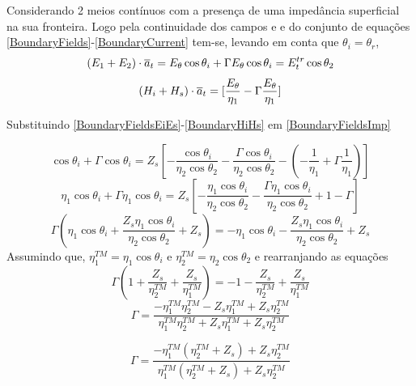 \documentclass[
	12pt,				%
	openright,			%
	oneside,			%
	a4paper,			%
	english,			%
	brazil				%
	]{abntex2}
\begin{document}
\begin{apendicesenv}
Considerando 2 meios contínuos com a presença de uma impedância superficial na sua fronteira. Logo pela continuidade dos campos e e do conjunto de equações \ref{BoundaryFields}-\ref{BoundaryCurrent} tem-se, levando em conta que    ${\theta}_{i}={\theta}_{r}$,
\begin{equation}{\label{BoundaryFieldsEiEs}}
(E_1+E_2) \cdot \overline{a}_t=E_{\theta}\cos{\theta_{i}} +
  \Gamma E_{\theta}\cos{\theta_{i}} =E^{tr}_{t}\cos{\theta_{2}}
\end{equation}
\begin{equation}{\label{BoundaryHiHs}}
(H_i+H_s) \cdot \overline{a}_t=[ \frac{E_{\theta}}{\eta_1} -
  \Gamma \frac{E_{\theta} }{\eta_1} ]
\end{equation}

Substituindo \ref{BoundaryFieldsEiEs}-\ref{BoundaryHiHs} em \ref{BoundaryFieldsImp}

\begin{equation}
\cos{\theta_{i}} +
  \Gamma \cos{\theta_{i}} 
  =Z_s 
  [ -\frac{\cos{\theta_{i}}  }{\eta_2\cos{\theta_{2}} } - \frac{\Gamma \cos{\theta_{i}}  }{\eta_2\cos{\theta_{2}} } -
  (-\frac{1}{\eta_1} +\Gamma\frac{1}{\eta_1} )]
\end{equation}
\begin{equation}
\eta_1\cos{\theta_{i}} +
  \Gamma \eta_1\cos{\theta_{i}} 
  =Z_s 
  [ -\frac{\eta_1\cos{\theta_{i}}  }{\eta_2\cos{\theta_{2}} } - \frac{\Gamma \eta_1\cos{\theta_{i}}  }{\eta_2\cos{\theta_{2}} } +1-\Gamma]
\end{equation}
\begin{equation}
\Gamma(\eta_1\cos{\theta_{i}}+\frac{Z_s\eta_1\cos{\theta_{i}}  }{\eta_2\cos{\theta_{2}} }+Z_s)
= 
-\eta_1\cos{\theta_{i}} -\frac{Z_s\eta_1\cos{\theta_{i}}  }{\eta_2\cos{\theta_{2}} }+Z_s
\end{equation}
Assumindo que, $\eta_1^{TM}=\eta_1\cos{\theta_{i}}$ e $\eta_2^{TM}=\eta_2\cos{\theta_{2}}$ e rearranjando as equações
\begin{equation}
\Gamma(1+\frac{{Z_s} }{ \eta_2^{TM}}+\frac{Z_s}{\eta_1^{TM}})
= 
-1 -\frac{Z_s  }{\eta_2^{TM} }+\frac{Z_s}{\eta_1^{TM}}
\end{equation}
\begin{equation}
\Gamma=\frac{-\eta_1^{TM}\eta_2^{TM} -Z_s \eta_1^{TM} +{Z_s}\eta_2^{TM}}
{\eta_1^{TM}\eta_2^{TM}+Z_s \eta_1^{TM} +{Z_s}\eta_2^{TM}}
\end{equation}

\begin{equation}
\Gamma=\frac{-\eta_1^{TM}(\eta_2^{TM}+Z_s) +Z_s \eta_2^{TM} }
{\eta_1^{TM}(\eta_2^{TM}+Z_s) +Z_s \eta_2^{TM}}
\end{equation}


\end{apendicesenv}
\end{document}
